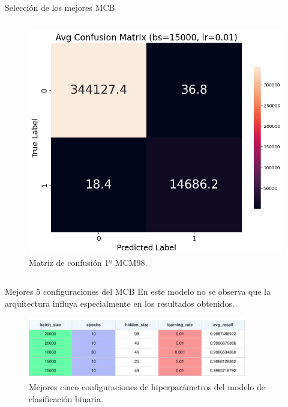 \begin{frame}{Selección de los mejores MCB}
\begin{columns}[b]
\begin{column}{0.3\textwidth}
\begin{figure}[H]
    \centering
    \includegraphics[width=1\textwidth]{../Memoria/img/modelo/matrices_confusion/MC_ENT_MCB98.png}
    \caption{Matriz de confusión 1º MCM98.}
    \label{fig:MC_ENT_MCB98}
\end{figure}

\end{column}
\end{columns}
\end{frame}


\begin{frame}{Mejores 5 configuraciones del MCB}
En este modelo no se observa que la arquitectura influya especialmente en los resultados obtenidos.
\begin{figure}[H]
    \centering
    \includegraphics[width=0.85\textwidth]{../Memoria/img/modelo/resultados/BINtop5.pdf}
    \caption{Mejores cinco configuraciones de hiperparámetros del modelo de clasificación binaria.}
    \label{fig:BINtop5}
\end{figure}

\end{frame}




